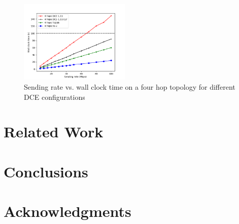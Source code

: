 \documentclass{sig-alternate}
\begin{document}
\begin{figure}[h!]
  \centering
    \includegraphics[width=0.47\textwidth]{figs/rate-vs-time.png}
  \caption{Sending rate vs. wall clock time on a four hop topology for different DCE configurations}
  \label{fig:rate-vs-time}
\end{figure}

\section{Related Work}

\section{Conclusions}

\section{Acknowledgments}
%

%
%
\end{document}
